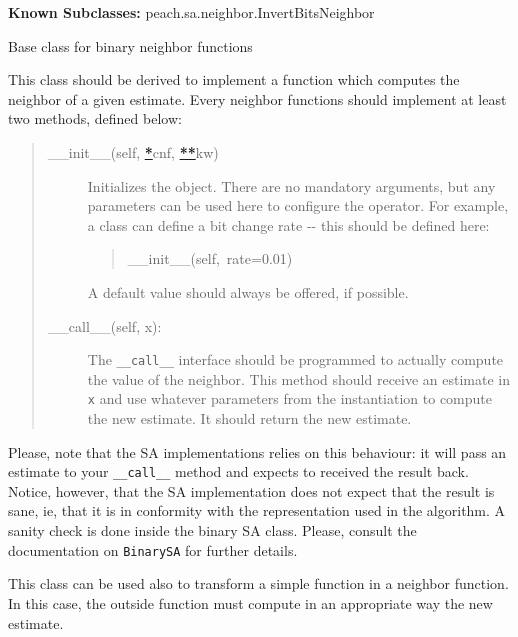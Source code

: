 \textbf{Known Subclasses:} peach.sa.neighbor.InvertBitsNeighbor


Base class for binary neighbor functions

This class should be derived to implement a function which computes the
neighbor of a given estimate. Every neighbor functions should implement at
least two methods, defined below:
%
\begin{quote}
%
\begin{description}
\item[{\_\_init\_\_(self, %
\hyperlink{id1}{\textbf{\color{red}*}}cnf, %
\hyperlink{id3}{\textbf{\color{red}**}}kw)}] \leavevmode 
Initializes the object. There are no mandatory arguments, but any
parameters can be used here to configure the operator. For example, a
class can define a bit change rate -{}- this should be defined here:
%
\begin{quote}{\ttfamily \raggedright \noindent
\_\_init\_\_(self,~rate=0.01)
}
\end{quote}

A default value should always be offered, if possible.

\item[{\_\_call\_\_(self, x):}] \leavevmode 
The \texttt{\_\_call\_\_} interface should be programmed to actually compute the
value of the neighbor. This method should receive an estimate in \texttt{x}
and use whatever parameters from the instantiation to compute the new
estimate. It should return the new estimate.

\end{description}

\end{quote}

Please, note that the SA implementations relies on this behaviour: it will
pass an estimate to your \texttt{\_\_call\_\_} method and expects to received the
result back. Notice, however, that the SA implementation does not expect
that the result is sane, ie, that it is in conformity with the
representation used in the algorithm. A sanity check is done inside the
binary SA class. Please, consult the documentation on \texttt{BinarySA} for
further details.

This class can be used also to transform a simple function in a neighbor
function. In this case, the outside function must compute in an appropriate
way the new estimate.


